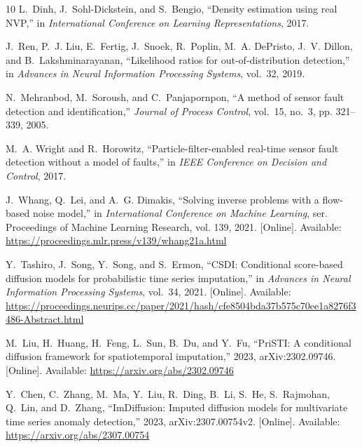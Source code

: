\documentclass[conference]{IEEEtran}
\newcommand{\1}{\mathbf{1}}
\begin{document}
\begin{thebibliography}{10}
L.~Dinh, J.~Sohl-Dickstein, and S.~Bengio, ``Density estimation using real
  {NVP},'' in \emph{International Conference on Learning Representations},
  2017.

J.~Ren, P.~J. Liu, E.~Fertig, J.~Snoek, R.~Poplin, M.~A. DePristo, J.~V.
  Dillon, and B.~Lakshminarayanan, ``Likelihood ratios for out-of-distribution
  detection,'' in \emph{Advances in Neural Information Processing Systems},
  vol.~32, 2019.

N.~Mehranbod, M.~Soroush, and C.~Panjapornpon, ``A method of sensor fault
  detection and identification,'' \emph{Journal of Process Control}, vol.~15,
  no.~3, pp. 321--339, 2005.

M.~A. Wright and R.~Horowitz, ``Particle-filter-enabled real-time sensor fault
  detection without a model of faults,'' in \emph{IEEE Conference on Decision
  and Control}, 2017.

\BIBentryALTinterwordspacing
J.~Whang, Q.~Lei, and A.~G. Dimakis, ``Solving inverse problems with a
  flow-based noise model,'' in \emph{International Conference on Machine
  Learning}, ser. Proceedings of Machine Learning Research, vol. 139, 2021.
  [Online]. Available: \url{https://proceedings.mlr.press/v139/whang21a.html}
\BIBentrySTDinterwordspacing

\BIBentryALTinterwordspacing
Y.~Tashiro, J.~Song, Y.~Song, and S.~Ermon, ``{CSDI}: Conditional score-based
  diffusion models for probabilistic time series imputation,'' in
  \emph{Advances in Neural Information Processing Systems}, vol.~34, 2021.
  [Online]. Available:
  \url{https://proceedings.neurips.cc/paper/2021/hash/cfe8504bda37b575c70ee1a8276f3486-Abstract.html}
\BIBentrySTDinterwordspacing

\BIBentryALTinterwordspacing
M.~Liu, H.~Huang, H.~Feng, L.~Sun, B.~Du, and Y.~Fu, ``{PriSTI}: A conditional
  diffusion framework for spatiotemporal imputation,'' 2023, arXiv:2302.09746.
  [Online]. Available: \url{https://arxiv.org/abs/2302.09746}
\BIBentrySTDinterwordspacing

\BIBentryALTinterwordspacing
Y.~Chen, C.~Zhang, M.~Ma, Y.~Liu, R.~Ding, B.~Li, S.~He, S.~Rajmohan, Q.~Lin,
  and D.~Zhang, ``{ImDiffusion}: Imputed diffusion models for multivariate time
  series anomaly detection,'' 2023, arXiv:2307.00754v2. [Online]. Available:
  \url{https://arxiv.org/abs/2307.00754}
\BIBentrySTDinterwordspacing


\end{thebibliography}
\end{document}
